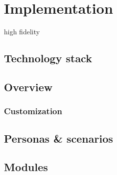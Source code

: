 \section{Implementation}
    
high fidelity



    \subsection{Technology stack}

    \subsection{Overview}

        \subsubsection{Customization}

    \subsection{Personas \& scenarios}

    \subsection{Modules}